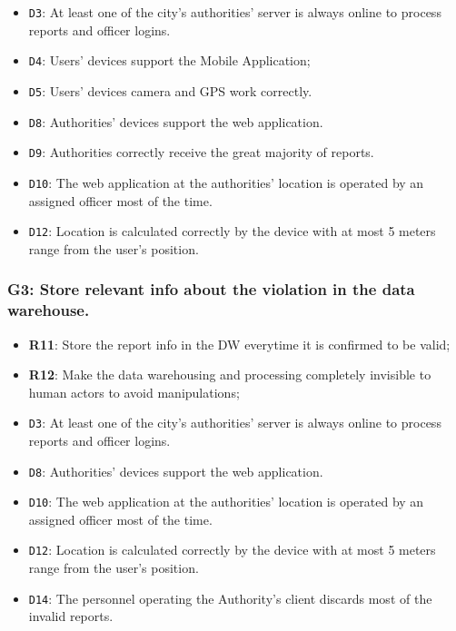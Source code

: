 \documentclass[12pt,a4paper]{article}
\begin{document}
	\begin{itemize}
			\item \texttt{D3}: At least one of the city's authorities' server is always online to process reports and officer logins.
			\item \texttt{D4}: Users' devices support the Mobile Application;
			\item \texttt{D5}: Users' devices camera and GPS work correctly.
			\item \texttt{D8}: Authorities' devices support the web application.
			\item \texttt{D9}: Authorities correctly receive the great majority of reports.
			\item \texttt{D10}: The web application at the authorities' location is operated by an assigned officer most of the time.
			\item \texttt{D12}: Location is calculated correctly by the device with at most 5 meters range from the user's position.
	\end{itemize}

\subsubsection{G3: Store relevant info about the violation in the data warehouse.}
	
	\begin{itemize}
			\item \textbf{R11}: Store the report info in the DW everytime it is confirmed to be valid;
			\item \textbf{R12}: Make the data warehousing  and processing completely invisible to human actors to avoid manipulations;
	\end{itemize}
	
	\begin{itemize}
			\item \texttt{D3}: At least one of the city's authorities' server is always online to process reports and officer logins.
			\item \texttt{D8}: Authorities' devices support the web application.
			\item \texttt{D10}: The web application at the authorities' location is operated by an assigned officer most of the time.
			\item \texttt{D12}: Location is calculated correctly by the device with at most 5 meters range from the user's position.
			\item \texttt{D14}: The personnel operating the Authority's client discards most of the invalid reports.
	\end{itemize}
\end{document}
